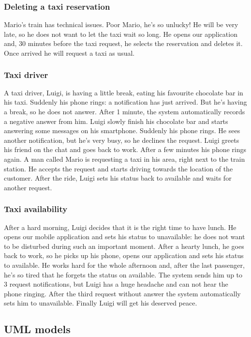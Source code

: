 \subsubsection{Deleting a taxi reservation}
Mario's train has technical issues. Poor Mario, he's so unlucky! He will be very late, 
so he does not want to let the taxi wait so long. He opens our application and, 30 minutes
before the taxi request, he selects the reservation and deletes it. Once arrived he will
request a taxi as usual.
\subsubsection{Taxi driver}
A taxi driver, Luigi, is having a little break, eating his favourite chocolate bar in his taxi. Suddenly
his phone rings: a notification has just arrived. But he's having a break, so he does not answer.
After 1 minute, the system automatically records a negative answer from him.
Luigi slowly finish his chocolate bar and starts answering some messages on his smartphone. Suddenly his phone
rings. He sees another notification, but he's very busy, so he declines the request. Luigi greets his
friend on the chat and goes back to work. After a few minutes his phone rings again. A man called
Mario is requesting a taxi in his area, right next to the train station. He accepts the request and
starts driving towards the location of the customer. After the ride, Luigi sets his status back to
available and waits for another request.
\subsubsection{Taxi availability}
After a hard morning, Luigi decides that it is the right time to have lunch. He opens our mobile
application and sets his status to unavailable: he does not want to be disturbed during such an
important moment. After a hearty lunch, he goes back to work, so he picks up his phone, opens our
application and sets his status to available. He works hard for the whole afternoon and, after the
last passenger, he's so tired that he forgets the status on available. The system sends him up to 3
request notifications, but Luigi has a huge headache and can not hear the phone ringing. After
the third request without answer the system automatically sets him to unavailable.
Finally Luigi will get his deserved peace.
\newpage
\subsection{UML models}
